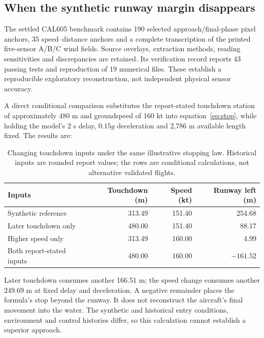 \subsection{When the synthetic runway margin disappears}
The settled CAL605 benchmark contains 190 selected approach/final-phase pixel anchors, 35 speed--distance anchors and a complete transcription of the printed five-sensor A/B/C wind fields. Source overlays, extraction methods, reading sensitivities and discrepancies are retained. Its verification record reports 43 passing tests and reproduction of 19 numerical files. These establish a reproducible exploratory reconstruction, not independent physical sensor accuracy.

A direct conditional comparison substitutes the report-stated touchdown station of approximately 480 m and groundspeed of 160 kt into equation~\eqref{eq:stop}, while holding the model's 2 s delay, $0.15g$ deceleration and 2,786 m available length fixed. The results are:
\begin{table}[H]
\centering\small
\caption{Changing touchdown inputs under the same illustrative stopping law. Historical inputs are rounded report values; the rows are conditional calculations, not alternative validated flights.}
\begin{tabular}{@{}lrrr@{}}
\toprule
Inputs & Touchdown (m) & Speed (kt) & Runway left (m)\\
\midrule
Synthetic reference & 313.49 & 151.40 & 254.68\\
Later touchdown only & 480.00 & 151.40 & 88.17\\
Higher speed only & 313.49 & 160.00 & 4.99\\
Both report-stated inputs & 480.00 & 160.00 & $-161.52$\\
\bottomrule
\end{tabular}
\end{table}
Later touchdown consumes another 166.51 m; the speed change consumes another 249.69 m at fixed delay and deceleration. A negative remainder places the formula's stop beyond the runway. It does not reconstruct the aircraft's final movement into the water. The synthetic and historical entry conditions, environment and control histories differ, so this calculation cannot establish a superior approach.

